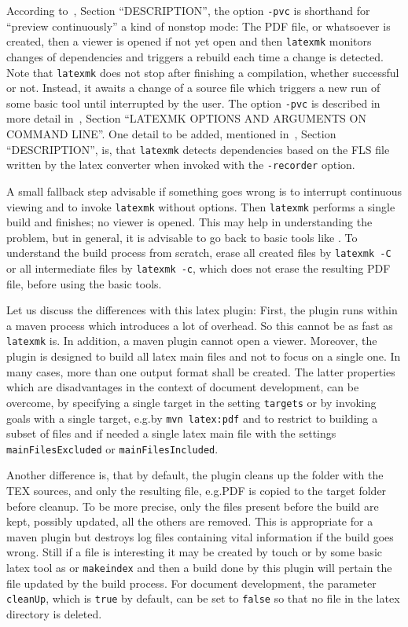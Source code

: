 According to~\cite{LatexMk23}, Section ``DESCRIPTION'', 
the option \texttt{-pvc} is shorthand for ``preview continuously'' a kind of nonstop mode: 
The PDF file, or whatsoever is created, 
then a viewer is opened if not yet open 
and then \texttt{latexmk} monitors changes of dependencies 
and triggers a rebuild each time a change is detected. 
Note that \texttt{latexmk} does not stop after finishing a compilation, 
whether successful or not. 
Instead, it awaits a change of a source file which triggers a new run of some basic tool 
until interrupted by the user. 
The option \texttt{-pvc} is described in more detail 
in~\cite{LatexMk23}, Section ``LATEXMK OPTIONS AND ARGUMENTS ON COMMAND LINE''. 
One detail to be added, mentioned in~\cite{LatexMk23}, Section ``DESCRIPTION'', is, 
that \texttt{latexmk} detects dependencies 
based on the FLS file written by the latex converter 
when invoked with the \texttt{-recorder} option. 

A small fallback step advisable if something goes wrong 
is to interrupt continuous viewing and to invoke \texttt{latexmk} without options. 
Then \texttt{latexmk} performs a single build and finishes; no viewer is opened. 
This may help in understanding the problem, 
but in general, it is advisable to go back to basic tools like \lualatex. 
To understand the build process from scratch, 
erase all created files by \texttt{latexmk -C} 
or all intermediate files by \texttt{latexmk -c}, which does not erase the resulting PDF file, 
before using the basic tools. 
\medskip



Let us discuss the differences with this latex plugin: 
First, the plugin runs within a maven process which introduces a lot of overhead. 
So this cannot be as fast as \texttt{latexmk} is. 
In addition, a maven plugin cannot open a viewer. 
Moreover, the plugin is designed to build all latex main files 
and not to focus on a single one. 
In many cases, more than one output format shall be created. 
The latter properties which are disadvantages in the context of document development, 
can be overcome, by specifying a single target in the setting \texttt{targets} 
or by invoking goals with a single target, e.g.\@ by \texttt{mvn latex:pdf} 
and to restrict to building a subset of files and if needed a single latex main file
with the settings \texttt{mainFilesExcluded} or \texttt{mainFilesIncluded}. 

Another difference is, that by default, the plugin cleans up the folder with the TEX sources, 
and only the resulting file, e.g.\@ PDF is copied to the target folder before cleanup. 
To be more precise, only the files present before the build are kept, possibly updated, 
all the others are removed. 
This is appropriate for a maven plugin but destroys log files containing vital information 
if the build goes wrong. 
Still if a file is interesting it may be created by touch or by some basic latex tool 
as \lualatex{} or \texttt{makeindex} 
and then a build done by this plugin will pertain the file updated by the build process. 
For document development, 
the parameter \texttt{cleanUp}, which is \texttt{true} by default, 
can be set to \texttt{false} 
so that no file in the latex directory is deleted. 

